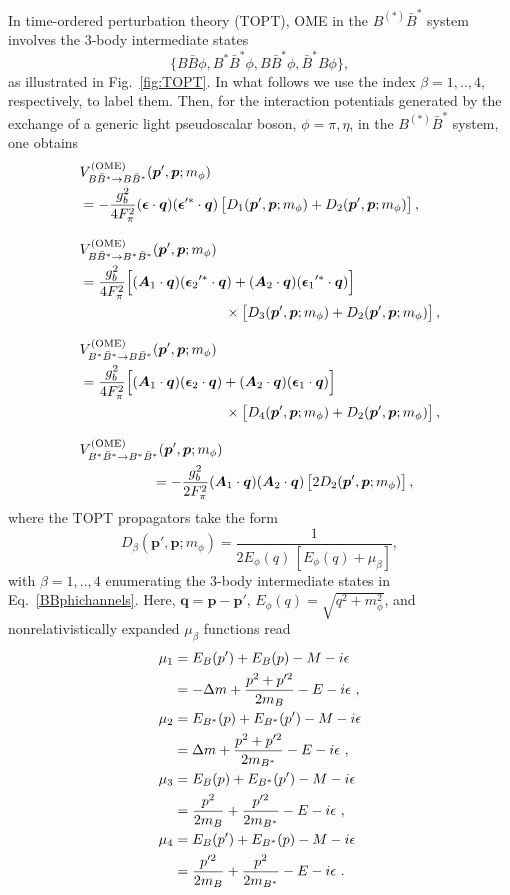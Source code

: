 \documentclass[aps,prd,showpacs,amsmath,twocolumn,superscriptaddress,floatfix,nofootinbib,notitlepage]{revtex4-2}
\newcommand{\vep}{{\bm p}}
\newcommand{\veq}{{\bm q}}
\newcommand{\veA}{{\bm A}}
\newcommand{\be}{\begin{equation}}
\newcommand{\ee}{\end{equation}}
\newcommand{\mG}{m_\phi}
\newcommand{\EG}{E_\phi}
\newcommand{\veep}{{\bm \epsilon}}
\newcommand{\veepst}{{\bm \epsilon}^{\prime*}}
\newcommand{\VOME}{V^{\rm (OME)}}
\begin{document}
In time-ordered perturbation theory (TOPT), OME in the $B^{(*)}\bar{B}^*$ system involves the 3-body intermediate states
\be
\{B\bar{B}\phi,B^*\bar{B}^*\phi,B\bar{B}^*\phi,\bar{B}^*B\phi\},
\label{BBphichannels}
\ee
as illustrated in Fig.~\ref{fig:TOPT}. 
In what follows we use the index $\beta=1,..,4$, respectively, to label them. Then, for the interaction potentials generated by the exchange of a generic light pseudoscalar boson, $\phi=\pi,\eta$, in the $B^{(*)}\bar{B}^*$ system, one obtains
\begin{align}
&\VOME_{B\bar{B}^*\to B\bar{B}^*}(\vep',\vep;m_\phi)\label{VBBstBBst}\\
&=-\frac{g_b^2}{4F_\pi^2}(\veep\cdot \veq)(\veepst\cdot \veq) \left[D_{1}(\vep',\vep;m_\phi)+D_{2}(\vep',\vep;m_\phi)\right],\notag
\\[3mm]
&\VOME_{B\bar{B}^*\to B^*\bar{B}^*}(\vep',\vep;m_\phi)\label{VBBstBstBst}\\
&=\frac{g_b^2}{4F_\pi^2}\Big[({\veA_1}\cdot \veq)({\veep_2}^{\prime *}\cdot \veq)+({\veA_2}\cdot \veq)({\veep_1}^{\prime *}\cdot \veq)\Big] \notag\\
&\hspace*{0.3\columnwidth}\times\left[D_{3}(\vep',\vep;m_\phi)+D_{2}(\vep',\vep;m_\phi)\right],\notag
\\[3mm]
&\VOME_{B^*\bar{B}^*\to B\bar{B}^*}(\vep',\vep;m_\phi)\label{VBstBstBBst}\\
&=\frac{g_b^2}{4F_\pi^2}\Big[({\veA_1}\cdot \veq)({\veep_2}\cdot \veq)+({\veA_2}\cdot \veq)({\veep_1}\cdot \veq)\Big] \notag\\
&\hspace*{0.3\columnwidth}\times\left[D_{4}(\vep',\vep;m_\phi)+D_{2}(\vep',\vep;m_\phi)\right],
\notag\\[3mm]
&\VOME_{B^*\bar{B}^*\to B^*\bar{B}^*}(\vep',\vep;m_\phi)\label{VBstBstBstBst}\\
&\hspace*{0.15\columnwidth}=-\frac{g_b^2}{2F_\pi^2}(\veA_1\cdot \veq)(\veA_2\cdot \veq) \left[ 2D_{2}(\vep',\vep;m_\phi)\right], \notag
\end{align}
where the TOPT propagators take the form
\be
D_\beta(\vep',\vep;\mG)=\frac1{2\EG(q)\,[\EG (q)+\mu_\beta]},
\label{eq:Dbeta}
\ee
with $\beta=1,..,4$ enumerating the 3-body intermediate states in Eq.~\eqref{BBphichannels}. Here, $\veq=\vep-\vep'$, $\EG(q)=\sqrt{q^2+\mG^2}$, and
nonrelativistically expanded $\mu_\beta$ functions read
\begin{align}
\mu_1&=E_B(p')+E_B(p)-M-i\epsilon \notag\\
&= -\Delta m+\frac{p^2+p^{\prime2}}{2m_B}-E-i\epsilon\ , \notag \\
\mu_2&=E_{B^*}(p)+E_{B^*}(p')-M-i\epsilon \notag\\ &= \Delta m+\frac{p^2+p^{\prime2}}{2m_{B^*}}-E-i\epsilon \ , \notag\\
\mu_3&=E_{B}(p)+E_{B^*}(p')-M-i\epsilon \notag \\ &=\frac{p^2}{2m_{B}}+
\frac{p^{\prime2}}{2m_{B^*}}-E-i\epsilon \ , \label{eq:alphaOME}
 \\
\mu_4&=E_{B}(p')+E_{B^*}(p)-M-i\epsilon \notag \\ &=\frac{p^{\prime2}}{2m_{B}}+
\frac{p^2}{2m_{B^*}}-E-i\epsilon \ . \notag 
\end{align}
\end{document}
